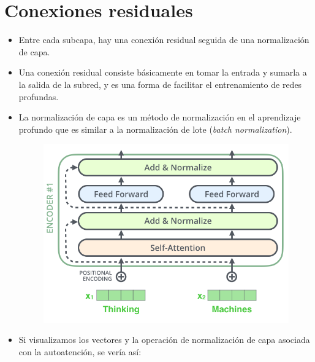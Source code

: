 \section{Conexiones residuales}
\begin{itemize}

\item Entre cada subcapa, hay una conexión residual seguida de una normalización de capa.

\item Una conexión residual consiste básicamente en tomar la entrada y sumarla a la salida de la subred, y es una forma de facilitar el entrenamiento de redes profundas.

\item La normalización de capa es un método de normalización en el aprendizaje profundo que es similar a la normalización de lote (\textit{batch normalization}).

\begin{figure}[h]
  \centering
  \includegraphics[scale=0.3]{pics/transformer_resideual_layer_norm.png}
\end{figure}

\item Si visualizamos los vectores y la operación de normalización de capa asociada con la autoatención, se vería así:


\end{itemize}
